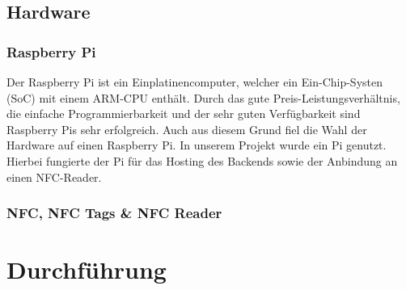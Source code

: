 \documentclass[10pt, a4paper]{article}
\begin{document}
\begin{onehalfspace}
  \subsection{Hardware}
  \subsubsection*{Raspberry Pi}
    Der Raspberry Pi ist ein Einplatinencomputer, welcher ein Ein-Chip-Systen (SoC) mit einem ARM-CPU enthält.
    Durch das gute Preis-Leistungsverhältnis, die einfache Programmierbarkeit und der sehr guten Verfügbarkeit sind Raspberry Pis sehr erfolgreich.
    Auch aus diesem Grund fiel die Wahl der Hardware auf einen Raspberry Pi.
    In unserem Projekt wurde ein Pi genutzt.
    Hierbei fungierte der Pi für das Hosting des Backends sowie der Anbindung an einen NFC-Reader.

  \subsubsection*{NFC, NFC Tags & NFC Reader}


  \section{Durchführung}

\end{onehalfspace}
\end{document}
